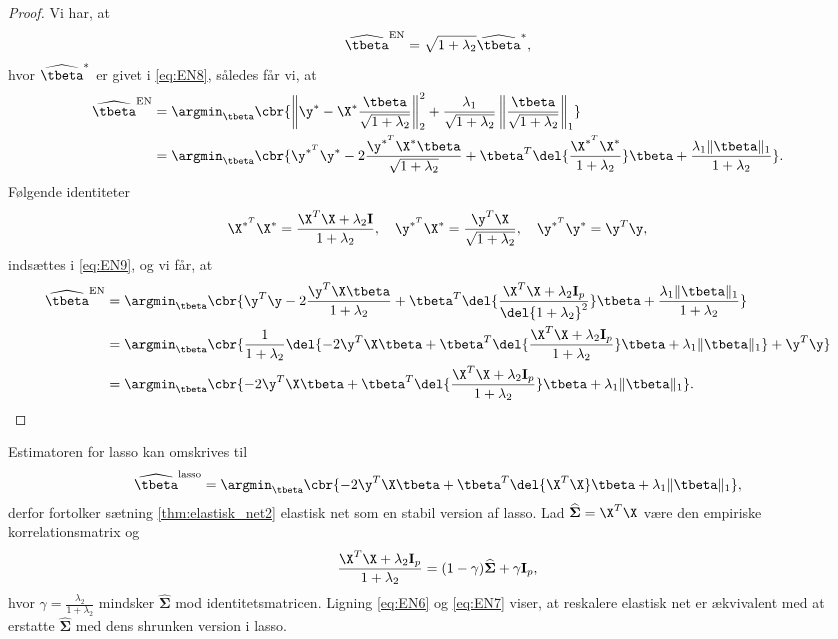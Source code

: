 \begin{proof}
Vi har, at
\begin{align*}
\widehat{\tbeta}^\text{EN} = \sqrt{1+\lambda_2} \widehat{\tbeta}^*,
\end{align*}
hvor \(\widehat{\tbeta}^*\) er givet i \eqref{eq:EN8}, således får vi, at
\begin{align}
\widehat{\tbeta}^\text{EN} &= \argmin_{\tbeta} \cbr{\left\Vert \y^* - \X^* \frac{\tbeta}{\sqrt{1+\lambda_2}} \right\Vert_2^2 + \frac{\lambda_1}{\sqrt{1+\lambda_2}} \left\Vert \frac{\tbeta}{\sqrt{1+\lambda_2}} \right\Vert_1} \nonumber \\
&=\argmin_{\tbeta} \cbr{ \y^{*^T} \y^* - 2 \frac{\y^{*^T} \X^* \tbeta}{\sqrt{1+\lambda_2}} + \tbeta^T \del{\frac{\X^{*^T} \X^*}{1+\lambda_2}} \tbeta + \frac{\lambda_1 \Vert \tbeta \Vert_1}{1+\lambda_2}}. \label{eq:EN9}
\end{align}
Følgende identiteter
\begin{align*}
\X^{*^T} \X^* = \frac{\X^T \X + \lambda_2 \mathbf{I}}{1+ \lambda_2}, \quad \y^{*^T} \X^* = \frac{\y^T \X}{\sqrt{1+\lambda_2}} , \quad \y^{*^T} \y^* = \y^T \y, 
\end{align*}
indsættes i \eqref{eq:EN9}, og vi får, at
\begin{align*}
\widehat{\tbeta}^\text{EN} &= \argmin_{\tbeta} \cbr{\y^T \y - 2 \frac{\y^T \X \tbeta}{1+\lambda_2} + \tbeta^T \del{\frac{\X^T \X + \lambda_2 \mathbf{I}_p}{\del{1+\lambda_2}^2}} \tbeta + \frac{\lambda_1 \Vert \tbeta \Vert_1}{1+\lambda_2}} \\ 
&= \argmin_{\tbeta} \cbr{\frac{1}{1+\lambda_2} \del{- 2 \y^T \X \tbeta + \tbeta^T \del{\frac{\X^T \X + \lambda_2 \mathbf{I}_p}{1+ \lambda_2}} \tbeta + \lambda_1 \Vert \tbeta \Vert_1} + \y^T \y} \\
&= \argmin_{\tbeta} \cbr{- 2 \y^T \X \tbeta + \tbeta^T \del{\frac{\X^T \X + \lambda_2 \mathbf{I}_p}{1+ \lambda_2}} \tbeta + \lambda_1 \Vert \tbeta \Vert_1}.
\end{align*}
\end{proof}
%
Estimatoren for lasso kan omskrives til
\begin{align}
\widehat{\tbeta}^\text{lasso} = \argmin_{\tbeta} \cbr{ - 2 \y^T \X \tbeta + \tbeta^T \del{\X^T \X} \tbeta  + \lambda_1 \Vert \tbeta \Vert_1}, \label{eq:EN7}
\end{align}
derfor fortolker sætning \ref{thm:elastisk_net2} elastisk net som en stabil version af lasso.
Lad \(\widehat{\boldsymbol{\Sigma}} = \X^T \X\) være den empiriske korrelationsmatrix og
\begin{align*}
\frac{\X^T \X + \lambda_2 \mathbf{I}_p}{1 + \lambda_2} = (1-\gamma) \widehat{\boldsymbol{\Sigma}} + \gamma \mathbf{I}_p,
\end{align*}
hvor \(\gamma=\frac{\lambda_2}{1+\lambda_2}\) mindsker \(\widehat{\boldsymbol{\Sigma}}\) mod identitetsmatricen.
Ligning \eqref{eq:EN6} og \eqref{eq:EN7} viser, at reskalere elastisk net er ækvivalent med at erstatte \(\widehat{\boldsymbol{\Sigma}}\) med dens shrunken version i lasso.

